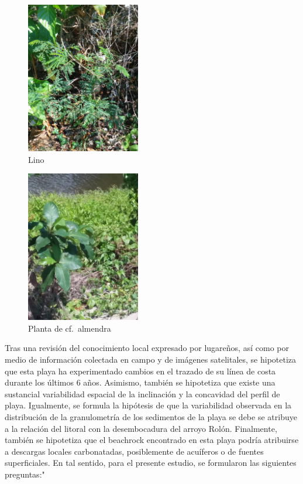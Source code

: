 \documentclass[11pt,]{article}
\begin{document}
\begin{figure}
\centering
\includegraphics[height=2.60417in]{Limo.jpeg}
\caption{Lino \label{Limo}}
\end{figure}

\begin{figure}
\centering
\includegraphics[height=2.60417in]{Almendra.jpeg}
\caption{Planta de cf.~almendra \label{Almendra}}
\end{figure}

Tras una revisión del conocimiento local expresado por lugareños, así
como por medio de información colectada en campo y de imágenes
satelitales, se hipotetiza que esta playa ha experimentado cambios en el
trazado de su línea de costa durante los últimos 6 años. Asimismo,
también se hipotetiza que existe una sustancial variabilidad espacial de
la inclinación y la concavidad del perfil de playa. Igualmente, se
formula la hipótesis de que la variabilidad observada en la distribución
de la granulometría de los sedimentos de la playa se debe se atribuye a
la relación del litoral con la desembocadura del arroyo Rolón.
Finalmente, también se hipotetiza que el beachrock encontrado en esta
playa podría atribuirse a descargas locales carbonatadas, posiblemente
de acuíferos o de fuentes superficiales. En tal sentido, para el
presente estudio, se formularon las siguientes preguntas:"
\end{document}

